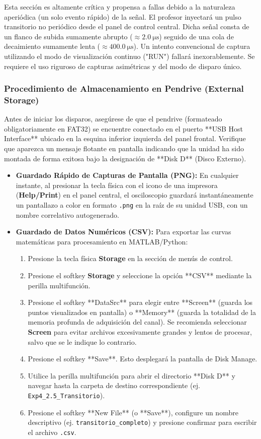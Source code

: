 \documentclass[12pt, letterpaper]{article}
\begin{document}
Esta sección es altamente crítica y propensa a fallas debido a la naturaleza aperiódica (un solo evento rápido) de la señal. El profesor inyectará un pulso transitorio no periódico desde el panel de control central. Dicha señal consta de un flanco de subida sumamente abrupto ($\approx \SI{2.0}{\micro\second}$) seguido de una cola de decaimiento sumamente lenta ($\approx \SI{400.0}{\micro\second}$). Un intento convencional de captura utilizando el modo de visualización continuo ("RUN") fallará inexorablemente. Se requiere el uso riguroso de capturas asimétricas y del modo de disparo único.

\subsubsection*{Procedimiento de Almacenamiento en Pendrive (External Storage)}
Antes de iniciar los disparos, asegúrese de que el pendrive (formateado obligatoriamente en FAT32) se encuentre conectado en el puerto **USB Host Interface** ubicado en la esquina inferior izquierda del panel frontal. Verifique que aparezca un mensaje flotante en pantalla indicando que la unidad ha sido montada de forma exitosa bajo la designación de **Disk D** (Disco Externo).
\begin{itemize}
    \item \textbf{Guardado Rápido de Capturas de Pantalla (PNG):} En cualquier instante, al presionar la tecla física con el icono de una impresora (\textbf{Help/Print}) en el panel central, el osciloscopio guardará instantáneamente un pantallazo a color en formato \texttt{.png} en la raíz de su unidad USB, con un nombre correlativo autogenerado.
    \item \textbf{Guardado de Datos Numéricos (CSV):} Para exportar las curvas matemáticas para procesamiento en MATLAB/Python:
    \begin{enumerate}[label=\roman*.]
        \item Presione la tecla física \textbf{Storage} en la sección de menús de control.
        \item Presione el softkey \textbf{Storage} y seleccione la opción **CSV** mediante la perilla multifunción.
        \item Presione el softkey **DataSrc** para elegir entre **Screen** (guarda los puntos visualizados en pantalla) o **Memory** (guarda la totalidad de la memoria profunda de adquisición del canal). Se recomienda seleccionar \textbf{Screen} para evitar archivos excesivamente grandes y lentos de procesar, salvo que se le indique lo contrario.
        \item Presione el softkey **Save**. Esto desplegará la pantalla de Disk Manage.
        \item Utilice la perilla multifunción para abrir el directorio **Disk D** y navegar hasta la carpeta de destino correspondiente (ej. \texttt{Exp4\_2.5\_Transitorio}).
        \item Presione el softkey **New File** (o **Save**), configure un nombre descriptivo (ej. \texttt{transitorio\_completo}) y presione confirmar para escribir el archivo \texttt{.csv}.
    \end{enumerate}
\end{itemize}
\end{document}
